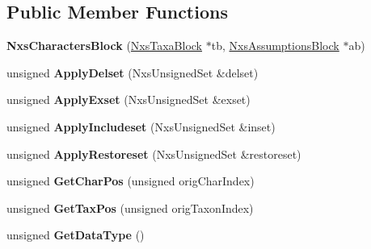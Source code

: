 \subsection*{Public Member Functions}
\begin{DoxyCompactItemize}
\item 
\hypertarget{classNxsCharactersBlock_a8725c329790b33cdcf52c6aa1ee30b19}{
{\bfseries NxsCharactersBlock} (\hyperlink{classNxsTaxaBlock}{NxsTaxaBlock} $\ast$tb, \hyperlink{classNxsAssumptionsBlock}{NxsAssumptionsBlock} $\ast$ab)}
\label{classNxsCharactersBlock_a8725c329790b33cdcf52c6aa1ee30b19}

\item 
\hypertarget{classNxsCharactersBlock_ab8954865f54fb384cb13c299bd19b407}{
unsigned {\bfseries ApplyDelset} (NxsUnsignedSet \&delset)}
\label{classNxsCharactersBlock_ab8954865f54fb384cb13c299bd19b407}

\item 
\hypertarget{classNxsCharactersBlock_ae724d86e3ec64f4ee56962e69eabdb0b}{
unsigned {\bfseries ApplyExset} (NxsUnsignedSet \&exset)}
\label{classNxsCharactersBlock_ae724d86e3ec64f4ee56962e69eabdb0b}

\item 
\hypertarget{classNxsCharactersBlock_a39d83d6ddebf1b5abeda386812577d04}{
unsigned {\bfseries ApplyIncludeset} (NxsUnsignedSet \&inset)}
\label{classNxsCharactersBlock_a39d83d6ddebf1b5abeda386812577d04}

\item 
\hypertarget{classNxsCharactersBlock_a4ad02c2fc15ecb81f391f1ac27163de8}{
unsigned {\bfseries ApplyRestoreset} (NxsUnsignedSet \&restoreset)}
\label{classNxsCharactersBlock_a4ad02c2fc15ecb81f391f1ac27163de8}

\item 
\hypertarget{classNxsCharactersBlock_ad4b8b10e9e3367fa1ecac7a14266f3a8}{
unsigned {\bfseries GetCharPos} (unsigned origCharIndex)}
\label{classNxsCharactersBlock_ad4b8b10e9e3367fa1ecac7a14266f3a8}

\item 
\hypertarget{classNxsCharactersBlock_ae8ebb5ab6fb300779b5a67b2259a92db}{
unsigned {\bfseries GetTaxPos} (unsigned origTaxonIndex)}
\label{classNxsCharactersBlock_ae8ebb5ab6fb300779b5a67b2259a92db}

\item 
\hypertarget{classNxsCharactersBlock_a450d8f31ed9662e1930aac87eb61d8aa}{
unsigned {\bfseries GetDataType} ()}
\label{classNxsCharactersBlock_a450d8f31ed9662e1930aac87eb61d8aa}


\end{DoxyCompactItemize}
